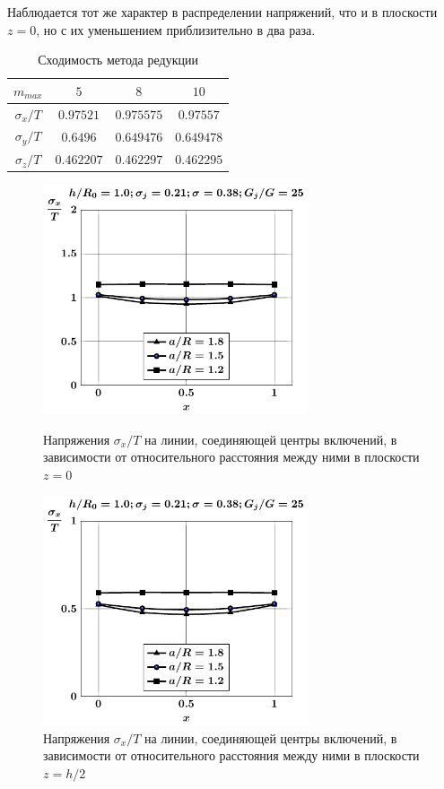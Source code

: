 Наблюдается тот же характер в распределении напряжений, что и в плоскости $z=0$, но с их уменьшением приблизительно в два раза.

\begin{table}[h!]
\centering
\caption{Сходимость метода редукции}
\label{tab:1}
\begin{tabular}{|c|c|c|c|}
\hline
$m_{max}$ & $5$ & $8$ & $10$ \\
\hline
$\sigma_x/T$ & $0.97521$ & $0.975575$ & $0.97557$ \\
\hline
$\sigma_y/T$ & $0.6496$ & $0.649476$ & $0.649478$ \\
\hline
$\sigma_z/T$ & $0.462207$ & $0.462297$ & $0.462295$ \\
\hline
\end{tabular}
\end{table}

\begin{figure}[h!]
\centering\footnotesize
\parbox[b]{7.5cm}{\centering\includegraphics[width=7.8cm]{inc16-a-h10-r10-g25-z0-sig-x.pdf}
\caption{Напряжения $\sigma_x/T$ на линии, соединяющей центры включений, в зависимости от относительного расстояния между ними в плоскости $z=0$
\label{fig:2}}}\hfil\hfil
\parbox[b]{7.5cm}{\centering\includegraphics[width=7.8cm]{inc16-a-h10-r10-g25-z1-sig-x.pdf}
\caption{Напряжения $\sigma_x/T$ на линии, соединяющей центры включений, в зависимости от относительного расстояния между ними в плоскости $z=h/2$
\label{fig:3}
}}
\end{figure}

